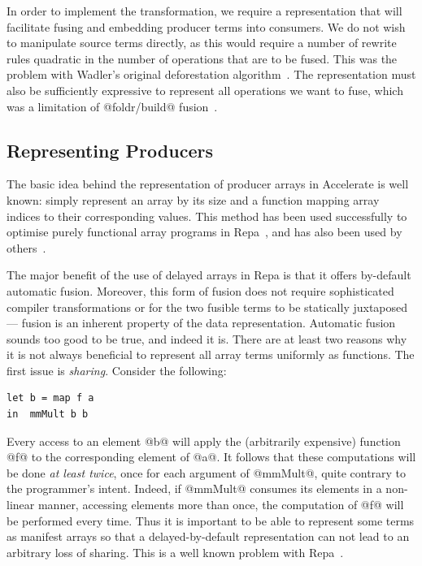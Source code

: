 
In order to implement the transformation, we require a representation that will
facilitate fusing and embedding producer terms into consumers. We do not wish to
manipulate source terms directly, as this would require a number of rewrite
rules quadratic in the number of operations that are to be fused. This was the
problem with Wadler's original deforestation
algorithm~\cite{Wadler:1981hy,Wadler:1990ix}. The representation must also be
sufficiently expressive to represent all operations we want to fuse, which was a
limitation of @foldr/build@ fusion~\cite{Gill:1993de}.


\subsection{Representing Producers}
\label{sec:representing_producers}

The basic idea behind the representation of producer arrays in Accelerate is
well known: simply represent an array by its size and a function mapping array
indices to their corresponding values. This method has been used successfully to
optimise purely functional array programs in Repa~\cite{Keller:2010er}, and has also been used by
others~\cite{Claessen:2012hl}.

The major benefit of the use of delayed arrays in Repa is that it offers
by-default automatic fusion. Moreover, this form of fusion does not require
sophisticated compiler transformations or for the two fusible terms to be
statically juxtaposed --- fusion is an inherent property of the data
representation.
%
Automatic fusion sounds too good to be true, and indeed it is. There are at
least two reasons why it is not always beneficial to represent all array terms
uniformly as functions. The first issue is \emph{sharing}. Consider the
following:
%
\begin{lstlisting}[style=haskell]
let b = map f a
in  mmMult b b
\end{lstlisting}
%
Every access to an element @b@ will apply the (arbitrarily expensive) function
@f@ to the corresponding element of @a@. It follows that these computations will
be done \emph{at least twice}, once for each argument of @mmMult@, quite
contrary to the programmer's intent. Indeed, if @mmMult@ consumes its elements
in a non-linear manner, accessing elements more than once, the computation of
@f@ will be performed every time. Thus it is important to be able to represent
some terms as manifest arrays so that a delayed-by-default representation can
not lead to an arbitrary loss of sharing. This is a well known problem with
Repa~\cite{Lippmeier:2012gx}.


